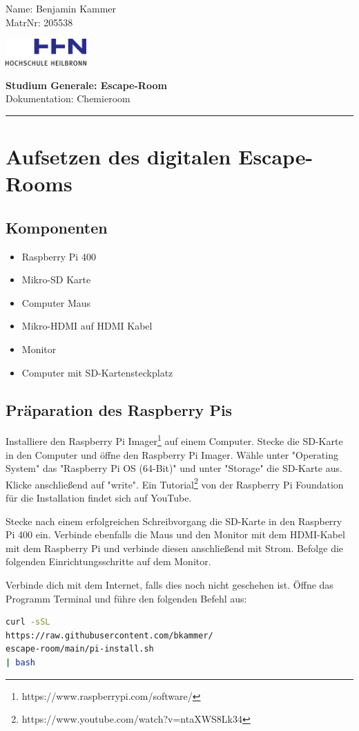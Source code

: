 \documentclass[12pt, letterpaper]{article}
\renewcommand\maketitle{
    \begin{flushleft}
        Name: Benjamin Kammer \\
        MatrNr: 205538
    \end{flushleft}

    \begin{flushright}\vspace{-15mm}
        \includegraphics[width=3.1cm]{logo.png}
    \end{flushright}

    \begin{center}
        \textbf{\large Studium Generale: Escape-Room}\\
        Dokumentation: Chemieroom
    \end{center}

    \rule{\linewidth}{0.1mm}

    \bigskip
}
\begin{document}
\maketitle

\section{Aufsetzen des digitalen Escape-Rooms}
\subsection{Komponenten}

\begin{itemize}
	\item Raspberry Pi 400
    \item Mikro-SD Karte
	\item Computer Maus
	\item Mikro-HDMI auf HDMI Kabel
	\item Monitor
    \item Computer mit SD-Kartensteckplatz
\end{itemize}

\subsection{Präparation des Raspberry Pis}

Installiere den Raspberry Pi Imager\footnote{https://www.raspberrypi.com/software/} auf einem Computer.
Stecke die SD-Karte in den Computer und öffne den Raspberry Pi Imager.
Wähle unter "Operating System" das "Raspberry Pi OS (64-Bit)" und unter "Storage" die SD-Karte aus.
Klicke anschließend auf "write".
Ein Tutorial\footnote{https://www.youtube.com/watch?v=ntaXWS8Lk34} von der Raspberry Pi Foundation für die Installation findet sich auf YouTube.

Stecke nach einem erfolgreichen Schreibvorgang die SD-Karte in den Raspberry Pi 400 ein.
Verbinde ebenfalls die Maus und den Monitor mit dem HDMI-Kabel mit dem Raspberry Pi und verbinde diesen anschließend mit Strom.
Befolge die folgenden Einrichtungsschritte auf dem Monitor.

Verbinde dich mit dem Internet, falls dies noch nicht geschehen ist.
Öffne das Programm Terminal und führe den folgenden Befehl aus:
\begin{lstlisting}[language=bash]
curl -sSL
https://raw.githubusercontent.com/bkammer/
escape-room/main/pi-install.sh
| bash
\end{lstlisting}
\end{document}
